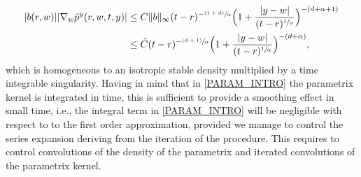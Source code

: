 \documentclass[11pt]{article}
\newcommand{\ie}{i.e.,\xspace}
\numberwithin{equation}{section}\providecommand{\asymp}{\mathrel{\sim}}
\newcommand{\psfrac}[2]{\sfrac{(#1)}{#2}}
\theoremstyle{plain}
\theoremstyle{definition}
\newcommand\1{{\mathbf{1}}}
\begin{document}
{\begin{equation}\label{DRIFT_KERNEL_BD_INTRO_SUB_CRIT}
\begin{aligned}
|b(r,w)||\nabla_w \tilde p^y(r,w,t,y)|
&\le  C \|b\|_\infty(t-r)^{-\psfrac{1+d}\alpha}\Bigl(1+\frac{|y-w|}{(t-r)^{\sfrac 1\alpha}}\Bigr)^{-(d+\alpha+1)}\\
&\le  \tilde C (t-r)^{-\psfrac{d+1}\alpha}\Bigl(1+\frac{|y-w|}{(t-r)^{\sfrac 1\alpha}}\Bigr)^{-(d+\alpha)},
\end{aligned}
\end{equation}
which is homogeneous to an isotropic stable density multiplied by a time integrable singularity.
Having in mind that in \eqref{PARAM_INTRO} the parametrix kernel is integrated in time,
this is sufficient to provide a smoothing effect in small time, \ie the integral term in \eqref{PARAM_INTRO} will be negligible with respect to to the first order approximation, provided we manage to control the series expansion deriving from the iteration of the procedure. This requires to control convolutions of the density of the parametrix and iterated convolutions of the parametrix kernel.}
\end{document}

